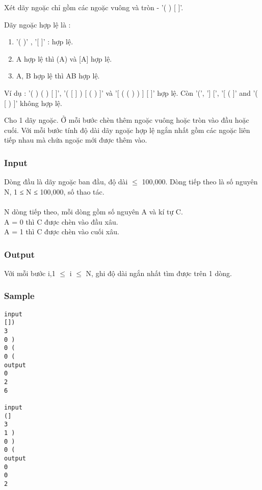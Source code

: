 

Xét dãy ngoặc chỉ gồm các ngoặc vuông và tròn - '( ) [ ]'.

Dãy ngoặc hợp lệ là :
\begin{enumerate}
	\item '( )' , '[ ]' : hợp lệ.
	\item A hợp lệ thì (A) và [A] hợp lệ.
	\item A, B hợp lệ thì AB hợp lệ.
\end{enumerate}

Ví dụ : '( ) ( ) [ ]', '( [ ] ) [ ( ) ]' và '[ ( ( ) ) ] [ ]' hợp lệ. Còn '(', '] [', '[ ( ]' and '( [ ) ]' không hợp lệ.

Cho 1 dãy ngoặc. Ở mỗi bước chèn thêm ngoặc vuông hoặc tròn vào đầu hoặc cuối. Với mỗi bước tính độ dài dãy ngoặc hợp lệ ngắn nhất gồm các ngoặc liên tiếp nhau mà chứa ngoặc mới được thêm vào.

\subsubsection{Input}

Dòng đầu là dãy ngoặc ban đầu, độ dài  $\le$  100,000. Dòng tiếp theo là số nguyên N, 1 ≤ N ≤ 100,000, số thao tác.
\\
\\N dòng tiếp theo, mỗi dòng gồm số nguyên A và kí tự C.
\\A = 0 thì C được chèn vào đầu xâu.
\\A = 1 thì C được chèn vào cuối xâu.

\subsubsection{Output}

Với mỗi bước i,1  $\le$  i  $\le$  N, ghi độ dài ngắn nhất tìm được trên 1 dòng.

\subsubsection{Sample}
\begin{verbatim}
input 
[]) 
3 
0 ) 
0 ( 
0 ( 
output 
0 
2 
6 

input 
(] 
3 
1 ) 
0 ) 
0 ( 
output 
0 
0 
2 
\end{verbatim}

 

